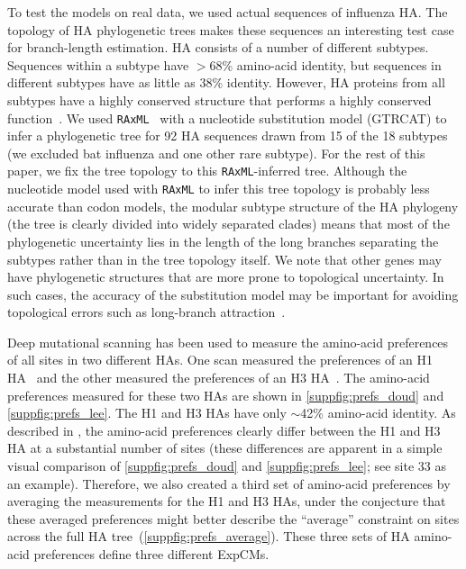 \documentclass[11pt]{article}
\begin{document}
To test the models on real data, we used actual sequences of influenza HA. 
The topology of HA phylogenetic trees makes these sequences an interesting test case for branch-length estimation.
HA consists of a number of different subtypes.
Sequences within a subtype have $>$68\% amino-acid identity, but sequences in different subtypes have as little as 38\% identity.
However, HA proteins from all subtypes have a highly conserved structure that performs a highly conserved function~\citep{ha2002h5,russell2004h1}.
We used \texttt{RAxML}~\citep{stamatakis2006raxml} with a nucleotide substitution model  (GTRCAT) to infer a phylogenetic tree for 92 HA sequences drawn from 15 of the 18 subtypes (we excluded bat influenza and one other rare subtype).
For the rest of this paper, we fix the tree topology to this \texttt{RAxML}-inferred tree.
Although the nucleotide model used with \texttt{RAxML} to infer this tree topology is probably less accurate than codon models, the modular subtype structure of the HA phylogeny (the tree is clearly divided into widely separated clades) means that most of the phylogenetic uncertainty lies in the length of the long branches separating the subtypes rather than in the tree topology itself.
We note that other genes may have phylogenetic structures that are more prone to topological uncertainty. 
In such cases, the accuracy of the substitution model may be important for avoiding topological errors such as long-branch attraction~\citep{felsenstein1978cases,lartillot2007suppression}.

Deep mutational scanning has been used to measure the amino-acid preferences of all sites in two different HAs.
One scan measured the preferences of an H1 HA~\citep{doud2016accurate} and the other measured the preferences of an H3 HA~\citep{lee2018deep}.
The amino-acid preferences measured for these two HAs are shown in \ref{suppfig:prefs_doud} and 
\ref{suppfig:prefs_lee}.
The H1 and H3 HAs have only $\sim$42\% amino-acid identity.
As described in \citet{lee2018deep}, the amino-acid preferences clearly differ between the H1 and H3 HA at a substantial number of sites (these differences are apparent in a simple visual comparison of \ref{suppfig:prefs_doud} and 
\ref{suppfig:prefs_lee}; see site 33 as an example).
Therefore, we also created a third set of amino-acid preferences by averaging the measurements for the H1 and H3 HAs, under the conjecture that these averaged preferences might better describe the ``average'' constraint on sites across the full HA tree~(\ref{suppfig:prefs_average}).
These three sets of HA amino-acid preferences define three different ExpCMs.
 
\end{document}
